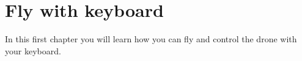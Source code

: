 \newpage
\chapter{Fly with keyboard} \lipsum[1]
In this first chapter you will learn how you can fly and control the drone with your keyboard.


